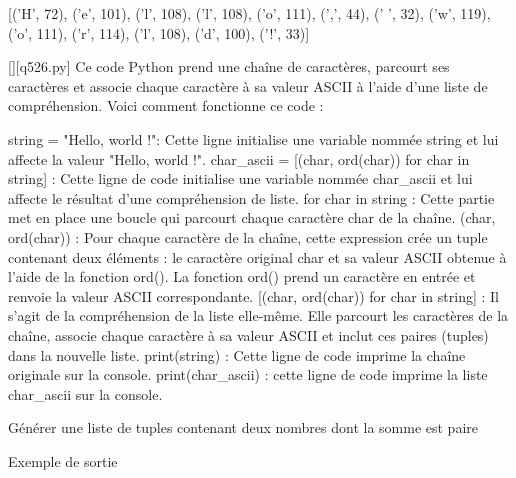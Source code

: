 [('H', 72), ('e', 101), ('l', 108), ('l', 108), ('o', 111), (',', 44), (' ', 32), ('w', 119), ('o', 111), ('r', 114), ('l', 108), ('d', 100), ('!', 33)]
        \par
        \begin{solution}
            \renewcommand{\nomfichier}{q526.py}
            \pythonfile{\chemincode \nomfichier}[][\nomfichier]
            Ce code Python prend une chaîne de caractères, parcourt ses caractères et associe chaque caractère à sa valeur ASCII à l'aide d'une liste de compréhension. Voici comment fonctionne ce code :

    string = "Hello, world !": Cette ligne initialise une variable nommée string et lui affecte la valeur "Hello, world !".
    char_ascii = [(char, ord(char)) for char in string] : Cette ligne de code initialise une variable nommée char_ascii et lui affecte le résultat d'une compréhension de liste.
        for char in string : Cette partie met en place une boucle qui parcourt chaque caractère char de la chaîne.
        (char, ord(char)) : Pour chaque caractère de la chaîne, cette expression crée un tuple contenant deux éléments : le caractère original char et sa valeur ASCII obtenue à l'aide de la fonction ord(). La fonction ord() prend un caractère en entrée et renvoie la valeur ASCII correspondante.
        [(char, ord(char)) for char in string] : Il s'agit de la compréhension de la liste elle-même. Elle parcourt les caractères de la chaîne, associe chaque caractère à sa valeur ASCII et inclut ces paires (tuples) dans la nouvelle liste.
    print(string) : Cette ligne de code imprime la chaîne originale sur la console.
    print(char_ascii) : cette ligne de code imprime la liste char_ascii sur la console.
        \end{solution}
        

        \question
        Générer une liste de tuples contenant deux nombres dont la somme est paire

Exemple de sortie

